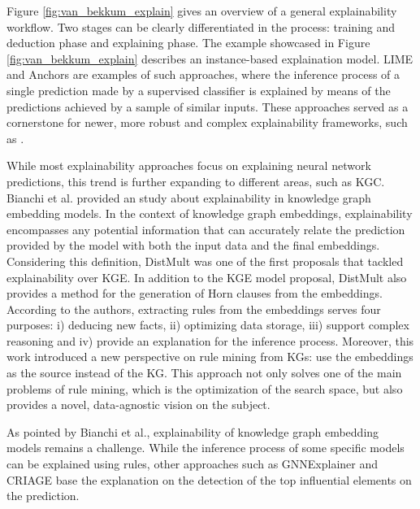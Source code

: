 Figure \ref{fig:van_bekkum_explain} gives an overview of a general explainability workflow. Two stages can be clearly differentiated in the process: training and deduction phase and explaining phase. The example showcased in Figure \ref{fig:van_bekkum_explain} describes an instance-based explaination model. LIME \cite{ribeiro_lime_2016} and Anchors \cite{Ribeiro_Singh_Guestrin_2018} are examples of such approaches, where the inference process of a single prediction made by a supervised classifier is explained by means of the predictions achieved by a sample of similar inputs. These approaches served as a cornerstone for newer, more robust and complex explainability frameworks, such as \cite{arya_one_2019}. 

While most explainability approaches focus on explaining neural network predictions, this trend is further expanding to different areas, such as KGC. Bianchi et al. \citep{bianchi_kge_explainability_2020} provided an study about explainability in knowledge graph embedding models. In the context of knowledge graph embeddings, explainability encompasses any potential information that can accurately relate the prediction provided by the model with both the input data and the final embeddings. Considering this definition, DistMult \citep{distmult} was one of the first proposals that tackled explainability over KGE. In addition to the KGE model proposal, DistMult also provides a method for the generation of Horn clauses from the embeddings. According to the authors, extracting rules from the embeddings serves four purposes: i) deducing new facts, ii) optimizing data storage, iii) support complex reasoning and iv) provide an explanation for the inference process. Moreover, this work introduced a new perspective on rule mining from KGs: use the embeddings as the source instead of the KG. This approach not only solves one of the main problems of rule mining, which is the optimization of the search space, but also provides a novel, data-agnostic vision on the subject. 

As pointed by Bianchi et al., explainability of knowledge graph embedding models remains a challenge. While the inference process of some specific models can be explained using rules, other approaches such as GNNExplainer \citep{ying_2019_gnnexplainer} and CRIAGE \citep{pezeshkpour_2019_investigating} base the explanation on the detection of the top influential elements on the prediction. 

